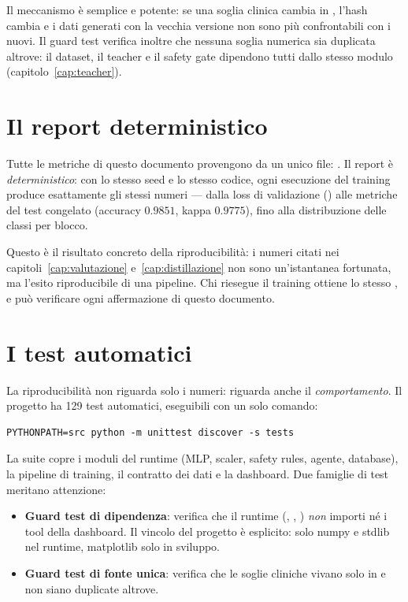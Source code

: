 Il meccanismo è semplice e potente: se una soglia clinica cambia in
, l'hash cambia e i dati generati con la vecchia
versione non sono più confrontabili con i nuovi. Il guard test
 verifica inoltre che nessuna soglia
numerica sia duplicata altrove: il dataset, il teacher e il safety gate
dipendono tutti dallo stesso modulo (capitolo~\ref{cap:teacher}).

\section{Il report deterministico}\label{sec:report-deterministico}

Tutte le metriche di questo documento provengono da un unico file:
. Il report è \emph{deterministico}: con lo
stesso seed e lo stesso codice, ogni esecuzione del training produce
esattamente gli stessi numeri — dalla loss di validazione
() alle metriche del test congelato
(accuracy $0.9851$, kappa $0.9775$), fino alla distribuzione delle classi
per blocco.

Questo è il risultato concreto della riproducibilità: i numeri citati nei
capitoli~\ref{cap:valutazione} e~\ref{cap:distillazione} non sono
un'istantanea fortunata, ma l'esito riproducibile di una pipeline. Chi
riesegue il training ottiene lo stesso , e può
verificare ogni affermazione di questo documento.

\section{I test automatici}\label{sec:test-automatici}

La riproducibilità non riguarda solo i numeri: riguarda anche il
\emph{comportamento}. Il progetto ha 129 test automatici, eseguibili con
un solo comando:

\begin{lstlisting}[caption={Esecuzione della suite di test del progetto.}]
PYTHONPATH=src python -m unittest discover -s tests
\end{lstlisting}

La suite copre i moduli del runtime (MLP, scaler, safety rules, agente,
database), la pipeline di training, il contratto dei dati e la dashboard.
Due famiglie di test meritano attenzione:

\begin{itemize}
  \item \textbf{Guard test di dipendenza}: 
        verifica che il runtime (, ,
        ) \emph{non} importi  né i tool
        della dashboard. Il vincolo del progetto è esplicito: solo numpy e
        stdlib nel runtime, matplotlib solo in sviluppo.
  \item \textbf{Guard test di fonte unica}: 
        verifica che le soglie cliniche vivano solo in
         e non siano duplicate altrove.
\end{itemize}

